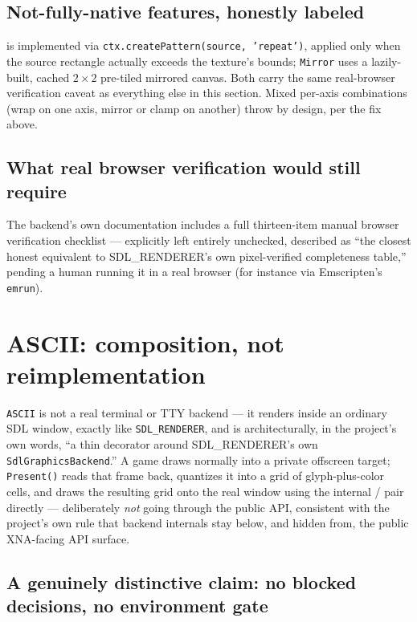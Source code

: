 \subsection{Not-fully-native features, honestly labeled}

 is implemented via \texttt{ctx.createPattern(source,
'repeat')}, applied only when the source rectangle actually exceeds the texture's bounds;
\texttt{Mirror} uses a lazily-built, cached $2\times2$ pre-tiled mirrored canvas. Both carry
the same real-browser verification caveat as everything else in this section. Mixed per-axis
combinations (wrap on one axis, mirror or clamp on another) throw by design, per the fix
above.

\subsection{What real browser verification would still require}

The backend's own documentation includes a full thirteen-item manual browser verification
checklist --- explicitly left entirely unchecked, described as ``the closest honest
equivalent to SDL\_RENDERER's own pixel-verified completeness table,'' pending a human
running it in a real browser (for instance via Emscripten's \texttt{emrun}).

\section{ASCII: composition, not reimplementation}

\texttt{ASCII} is not a real terminal or TTY backend --- it renders inside an ordinary SDL
window, exactly like \texttt{SDL\_RENDERER}, and is architecturally, in the project's own
words, ``a thin decorator around SDL\_RENDERER's own \texttt{SdlGraphicsBackend}.'' A game
draws normally into a private offscreen target; \texttt{Present()} reads that frame back,
quantizes it into a grid of glyph-plus-color cells, and draws the resulting grid onto the
real window using the internal  / 
pair directly --- deliberately \emph{not} going through the public  API,
consistent with the project's own rule that backend internals stay below, and hidden from,
the public XNA-facing API surface.

\subsection{A genuinely distinctive claim: no blocked decisions, no environment gate}

